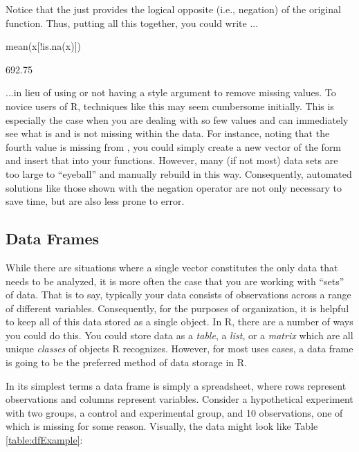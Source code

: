 Notice that the \R{!} just provides the logical opposite (i.e., negation) of the original function.  Thus, putting all this together, you could write ...

\begin{inR}
mean(x[!is.na(x)])
\end{inR}
\begin{outR}
[1] 692.75
\end{outR}

...in lieu of using or not having a  style argument to remove missing values.  To novice users of R, techniques like this may seem cumbersome initially.  This is especially the case when you are dealing with so few values and can immediately see what is and is not missing within the data. For instance, noting that the fourth value is missing from , you could simply create a new vector of the form  and insert that into your functions. However, many (if not most) data sets are too large to ``eyeball'' and manually rebuild in this way. Consequently, automated solutions like those shown with the negation operator are not only necessary to save time, but are also less prone to error.




\subsection{Data Frames}
\label{sec:data_frames}

While there are situations where a single vector constitutes the only data that needs to be analyzed, it is more often the case that you are working with ``sets'' of data.  That is to say, typically your data consists of observations across a range of different variables.  Consequently, for the purposes of organization, it is helpful to keep all of this data stored as a single object.  In R, there are a number of ways you could do this.  You could store data as a \textit{table}, a \textit{list}, or a \textit{matrix} which are all unique \textit{classes} of objects R recognizes. However, for most uses cases, a \gls{data frame} is going to be the preferred method of data storage in R.

In its simplest terms a data frame is simply a spreadsheet, where rows represent observations and columns represent variables. Consider a hypothetical experiment with two groups, a control and experimental group, and 10 observations, one of which is missing for some reason. Visually, the data might look like Table \ref{table:dfExample}: 


